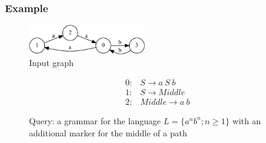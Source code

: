 \documentclass{beamer}
\begin{document}
\begin{frame}
  \transwipe[direction=90]
  \frametitle{Example}
\begin{figure}[ht]
    \centering
        \includegraphics[width=0.45\textwidth]{pictures/input.pdf}
        \caption{Input graph}
\end{figure}
\begin{figure}[ht]
\centering
   \[
\begin{array}{rl} 
   0:& S \rightarrow a \ S \ b \\
   1:& S \rightarrow Middle \\
   2:& Middle \rightarrow a \ b
\end{array}
\]
   \caption{Query: a grammar for the language $L=\{a^n b^n; n \geq 1\}$ with an additional marker for the middle of a path}
   \label{grammarG}        
    \end{figure}
\end{frame}
\end{document}
